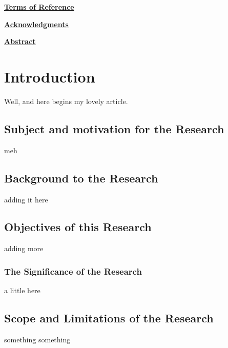 \documentclass[a4paper,11pt]{article}
\numberwithin{figure}{section}
\begin{document}
	\mbox{}
	\thispagestyle{empty}
	\newpage	
	
	
	{\centering\Huge\bfseries\underline{Terms of Reference}\par}
	\newpage
	
	{\centering\Huge\bfseries\underline{Acknowledgments}\par}
	\newpage
	
	\mbox{}
	\newpage
	
	{\centering\Huge\bfseries\underline{Abstract}\par}
	\newpage	
	
	\tableofcontents
	\newpage
		
	\listoffigures
	\newpage
 
	\listoftables
	\newpage
	
	\mbox{}
	 	 
	\printnomenclature	
	
		
	\newpage
	
	\newpage
	\newpage
	
\section{Introduction}
	Well, and here begins my lovely article.
	\subsection{Subject and motivation for the Research}
		meh
	\subsection{Background to the Research}
		adding it here
	\subsection{ Objectives of this Research}
		adding more
		\subsubsection{The Significance of the Research}
			a little here
	\subsection{Scope and Limitations of the Research}
		something something	
\end{document}
